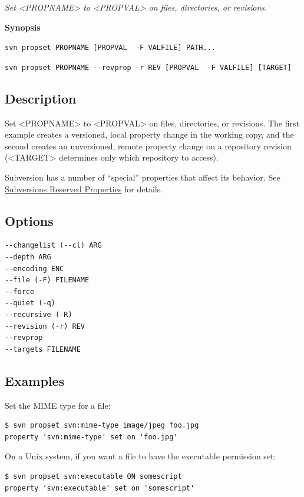 \emph{Set \textless PROPNAME\textgreater{} to
\textless PROPVAL\textgreater{} on files, directories, or revisions.}

\textbf{Synopsis}

\texttt{svn\ propset\ PROPNAME\ {[}PROPVAL\ \textbar{}\ -F\ VALFILE{]}\ PATH...}

\texttt{svn\ propset\ PROPNAME\ -\/-revprop\ -r\ REV\ {[}PROPVAL\ \textbar{}\ -F\ VALFILE{]}\ {[}TARGET{]}}

\subsection{Description}

Set \textless PROPNAME\textgreater{} to \textless PROPVAL\textgreater{}
on files, directories, or revisions. The first example creates a
versioned, local property change in the working copy, and the second
creates an unversioned, remote property change on a repository revision
(\textless TARGET\textgreater{} determines only which repository to
access).

Subversion has a number of ``special'' properties that affect its
behavior. See
\hyperref[svn.advanced.props.ref]{Subversion\textquotesingle s Reserved
Properties} for details.

\subsection{Options}

\begin{verbatim}
--changelist (--cl) ARG
--depth ARG
--encoding ENC
--file (-F) FILENAME
--force
--quiet (-q)
--recursive (-R)
--revision (-r) REV
--revprop
--targets FILENAME
\end{verbatim}

\subsection{Examples}

Set the MIME type for a file:

\begin{verbatim}
$ svn propset svn:mime-type image/jpeg foo.jpg 
property 'svn:mime-type' set on 'foo.jpg'
\end{verbatim}

On a Unix system, if you want a file to have the executable permission
set:

\begin{verbatim}
$ svn propset svn:executable ON somescript
property 'svn:executable' set on 'somescript'
\end{verbatim}

